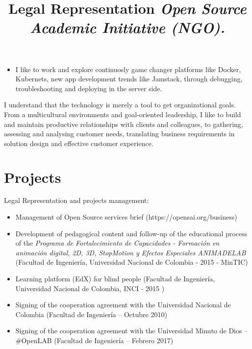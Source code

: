 \documentclass[overlapped,line,final]{res}
\begin{document}
\begin{resume}
\begin{itemize}
    \item I like to work and explore continuosly game changer platforms like Docker, Kubernets, new app development trends like Jamstack, through debugging, troubleshooting and deploying in the server side.
\end{itemize}
    
I understand that the technology is merely a tool to get organizational goals. From a multicultural environments and goal-oriented leadership, I like to build and maintain productive relationships with clients and colleagues, to gathering, assessing and analysing customer needs, translating business requirements in solution design and effective customer experience.

\vspace{0.5cm}
\section{\sc Projects } %
\vspace{0.5cm}
\title{\bf Legal Representation
	\newline \em Open Source Academic Initiative (NGO).
}
\begin{position}
Legal Representation and projects management:

\begin{itemize}
\item Management of Open Source services brief (https://opensai.org/business)
\item Development of pedagogical content and follow-up of the educational process of the \textit{Programa de Fortalecimiento de Capacidades - Formación en animación digital, 2D, 3D, StopMotion y Efectos Especiales ANIMADELAB} (Facultad de Ingeniería, Universidad Nacional de Colombia - 2015 - MinTIC)
\item Learning platform (EdX) for blind people (Facultad de Ingeniería, Universidad Nacional de Colombia, INCI - 2015 )
\item Signing of the cooperation agreement with the Universidad Nacional de Colombia (Facultad de Ingeniería – Octubre 2010)
\item Signing of the cooperation agreement with the Universidad Minuto de Dios – \#OpenLAB (Facultad de Ingeniería – Febrero 2017)
\end{itemize}


\end{position}
\end{resume}
\end{document}
